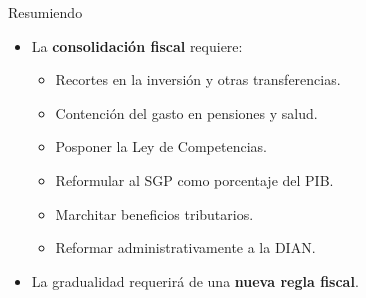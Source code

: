 \begin{frame}{Resumiendo}
\begin{itemize}
    \item La \textbf{consolidación fiscal} requiere:
    \begin{itemize}
        \item Recortes en la inversión y otras transferencias.
        \item Contención del gasto en pensiones y salud.
        \item Posponer la Ley de Competencias.
        \item Reformular al SGP como porcentaje del PIB.
        \item Marchitar beneficios tributarios.
        \item Reformar administrativamente a la DIAN.
    \end{itemize}
    \item La gradualidad requerirá de una \textbf{nueva regla fiscal}.
\end{itemize}    
\end{frame}


